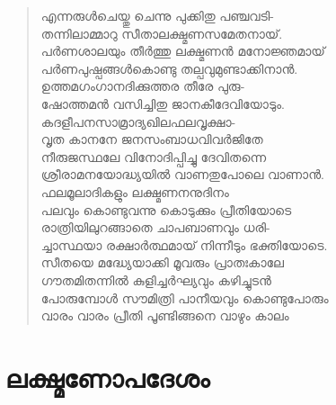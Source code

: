 \begin{verse}
എന്നരുള്‍ചെയ്തു ചെന്നു പുക്കിതു പഞ്ചവടി-\\
തന്നിലാമ്മാറു സീതാലക്ഷ്മണസമേതനായ്.\\
പര്‍ണശാലയും തീര്‍ത്തു ലക്ഷ്മണന്‍ മനോജ്ഞമായ്\\
പര്‍ണപുഷ്പങ്ങള്‍കൊണ്ടു തല്പവുമുണ്ടാക്കിനാന്‍.\\
ഉത്തമഗംഗാനദിക്കുത്തര തീരേ പുരു-\\
ഷോത്തമന്‍ വസിച്ചിതു ജാനകീദേവിയോടും.\\
കദളീപനസാമ്രാദ്യഖിലഫലവൃക്ഷാ-\\
വൃത കാനനേ ജനസംബാധവിവര്‍ജിതേ\\
നീരുജസ്ഥലേ വിനോദിപ്പിച്ചു ദേവിതന്നെ\\
ശ്രീരാമനയോദ്ധ്യയില്‍ വാണതുപോലെ വാണാന്‍.\\
ഫലമൂലാദികളും ലക്ഷ്മണനനുദിനം\\
പലവും കൊണ്ടുവന്നു കൊടുക്കും പ്രീതിയോടെ\\
രാത്രിയിലുറങ്ങാതെ ചാപബാണവും ധരി-\\
ച്ചാസ്ഥയാ രക്ഷാര്‍ത്ഥമായ് നിന്നീടും ഭക്തിയോടെ.\\
സീതയെ മദ്ധ്യേയാക്കി മൂവരും പ്രാതഃകാലേ\\
ഗൗതമിതന്നില്‍ കുളിച്ചര്‍ഘ്യവും കഴിച്ചുടന്‍\\
പോരുമ്പോള്‍ സൗമിത്രി പാനീയവും \hbox{കൊണ്ടുപോരും}\\
വാരം വാരം പ്രീതി പൂണ്ടിങ്ങനെ വാഴും കാലം
\end{verse}

\section{ലക്ഷ്മണോപദേശം}

